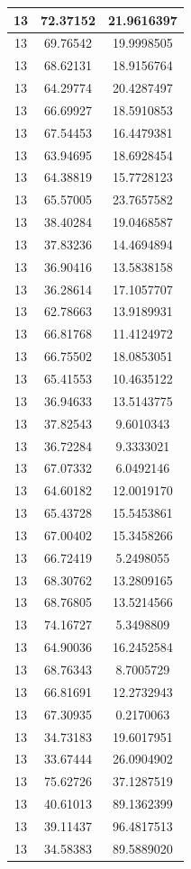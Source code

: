 \documentclass[
]{book}
\begin{document}
\begin{tabular}{c|c|c}
\hline
13 & 72.37152 & 21.9616397\\
\hline
13 & 69.76542 & 19.9998505\\
\hline
13 & 68.62131 & 18.9156764\\
\hline
13 & 64.29774 & 20.4287497\\
\hline
13 & 66.69927 & 18.5910853\\
\hline
13 & 67.54453 & 16.4479381\\
\hline
13 & 63.94695 & 18.6928454\\
\hline
13 & 64.38819 & 15.7728123\\
\hline
13 & 65.57005 & 23.7657582\\
\hline
13 & 38.40284 & 19.0468587\\
\hline
13 & 37.83236 & 14.4694894\\
\hline
13 & 36.90416 & 13.5838158\\
\hline
13 & 36.28614 & 17.1057707\\
\hline
13 & 62.78663 & 13.9189931\\
\hline
13 & 66.81768 & 11.4124972\\
\hline
13 & 66.75502 & 18.0853051\\
\hline
13 & 65.41553 & 10.4635122\\
\hline
13 & 36.94633 & 13.5143775\\
\hline
13 & 37.82543 & 9.6010343\\
\hline
13 & 36.72284 & 9.3333021\\
\hline
13 & 67.07332 & 6.0492146\\
\hline
13 & 64.60182 & 12.0019170\\
\hline
13 & 65.43728 & 15.5453861\\
\hline
13 & 67.00402 & 15.3458266\\
\hline
13 & 66.72419 & 5.2498055\\
\hline
13 & 68.30762 & 13.2809165\\
\hline
13 & 68.76805 & 13.5214566\\
\hline
13 & 74.16727 & 5.3498809\\
\hline
13 & 64.90036 & 16.2452584\\
\hline
13 & 68.76343 & 8.7005729\\
\hline
13 & 66.81691 & 12.2732943\\
\hline
13 & 67.30935 & 0.2170063\\
\hline
13 & 34.73183 & 19.6017951\\
\hline
13 & 33.67444 & 26.0904902\\
\hline
13 & 75.62726 & 37.1287519\\
\hline
13 & 40.61013 & 89.1362399\\
\hline
13 & 39.11437 & 96.4817513\\
\hline
13 & 34.58383 & 89.5889020\\
\hline
\end{tabular}
\end{document}
